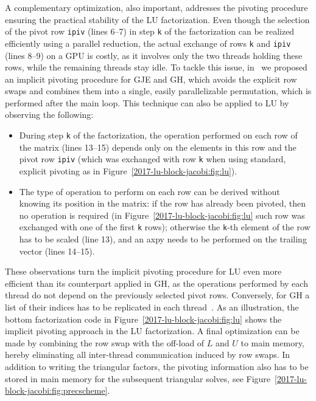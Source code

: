 A complementary optimization, also important,
addresses the pivoting procedure ensuring the practical stability of the LU factorization.
Even though the selection of the pivot row \texttt{ipiv} (lines 6--7)
in step \texttt{k} of the factorization
can be realized efficiently using a parallel reduction,
the actual exchange of rows \texttt{k} and \texttt{ipiv} (lines 8--9) on a GPU is costly,
as it involves only the two threads holding these rows,
while the remaining threads stay idle.
To tackle this issue, in~\cite{gje,gh} 
we proposed an implicit pivoting procedure
for GJE and GH, which avoids the explicit row swaps and combines them into
a single, easily parallelizable permutation,
which is performed after the main loop.
This technique can also be applied to LU by observing the following:
\begin{itemize}
\item During step \texttt{k} of the factorization,
    the operation performed on each row of the matrix (lines 13--15)
    depends only on the elements in this row and the pivot row \texttt{ipiv}
    (which was exchanged with row \texttt{k}
    when using standard, explicit pivoting as in Figure~\ref{2017-lu-block-jacobi:fig:lu}).
\item The type of operation to perform on each row
    can be derived without knowing its position in the matrix:
    if the row has already been pivoted, then no operation is required
    (in Figure~\ref{2017-lu-block-jacobi:fig:lu} such row was exchanged
    with one of the first \texttt{k} rows);
    otherwise the \texttt{k}-th element of the row has to be scaled
    (line 13),
    and an {\sc axpy} needs to be performed on the trailing vector (lines 14--15).
\end{itemize}
These observations turn the implicit pivoting procedure for LU
even more efficient than its counterpart applied in GH,
as the operations performed by each thread
do not depend on the previously selected pivot rows.
Conversely, for GH a list of their indices
has to be replicated in each thread~\cite{gh}.
As an illustration, the bottom factorization code in Figure~\ref{2017-lu-block-jacobi:fig:lu}
shows the implicit pivoting approach in the LU factorization.
A final optimization can be made by combining the row swap
with the off-load of $L$ and $U$ to main memory,
hereby eliminating all inter-thread communication induced by row swaps.
In addition to writing the triangular factors,
the pivoting information also has to
be stored in main memory for the subsequent triangular solves,
see Figure~\ref{2017-lu-block-jacobi:fig:precscheme}.

